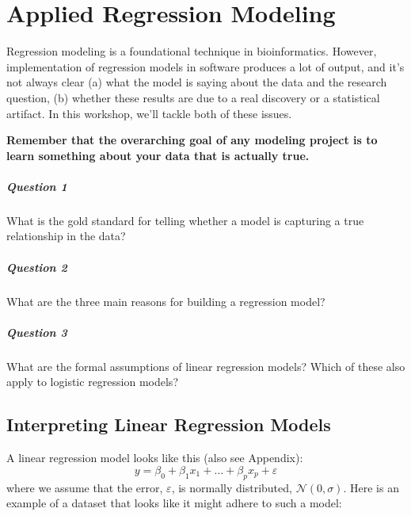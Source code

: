 \chapter{Applied Regression Modeling}

Regression modeling is a foundational technique in bioinformatics. However,  implementation of regression models in software produces a lot of output, and it's not always clear (a) what the model is saying about the data and the research question, (b) whether these results are due to a real discovery or a statistical artifact. In this workshop, we'll tackle both of these issues.

\textbf{Remember that the overarching goal of any modeling project is to learn something about your data that is actually true.}

\paragraph{Question 1} What is the gold standard for telling whether a model is capturing a true relationship in the data?

\vspace{30mm}

\paragraph{Question 2} What are the three main reasons for building a regression model?

\vspace{30mm}

\paragraph{Question 3} What are the formal assumptions of linear regression models? Which of these also apply to logistic regression models?

\newpage


\section{Interpreting Linear Regression Models}

A linear regression model looks like this (also see Appendix):
$$ y = \beta_0 + \beta_1 x_1 + \dots + \beta_p x_p + \varepsilon $$
where we assume that the error, $\varepsilon$, is normally distributed, $\mathcal{N}(0, \sigma)$. Here is an example of a dataset that looks like it might adhere to such a model:

